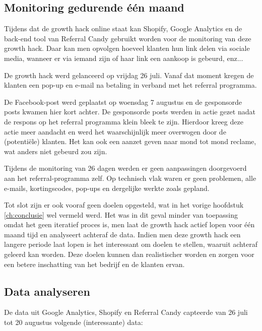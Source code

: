 \subsection{Monitoring gedurende één maand} \label{sec:monitoring-gedurende-twee-weken}
Tijdens dat de growth hack online staat kan Shopify, Google Analytics en de back-end tool van Referral Candy gebruikt worden voor de monitoring van deze growth hack. Daar kan men opvolgen hoeveel klanten hun link delen via sociale media, wanneer er via iemand zijn of haar link een aankoop is gebeurd, enz...

De growth hack werd gelanceerd op vrijdag 26 juli. Vanaf dat moment kregen de klanten een pop-up en e-mail na betaling in verband met het referral programma. 

De Facebook-post werd geplaatst op woensdag 7 augustus en de gesponsorde posts kwamen hier kort achter. De gesponsorde posts werden in actie gezet nadat de respons op het referral programma klein bleek te zijn. Hierdoor kreeg deze actie meer aandacht en werd het waarschijnlijk meer overwogen door de (potentiële) klanten. Het kan ook een aanzet geven naar mond tot mond reclame, wat anders niet gebeurd zou zijn.

Tijdens de monitoring van 26 dagen werden er geen aanpassingen doorgevoerd aan het referral-programma zelf. Op technisch vlak waren er geen problemen, alle e-mails, kortingscodes, pop-ups en dergelijke werkte zoals gepland.

Tot slot zijn er ook vooraf geen doelen opgesteld, wat in het vorige hoofdstuk \ref{ch:conclusie} wel vermeld werd. Het was in dit geval minder van toepassing omdat het geen iteratief proces is, men laat de growth hack actief lopen voor één maand tijd en analyseert achteraf de data. Indien men deze growth hack een langere periode laat lopen is het interessant om doelen te stellen, waaruit achteraf geleerd kan worden. Deze doelen kunnen dan realistischer worden en zorgen voor een betere inschatting van het bedrijf en de klanten ervan.

\subsection{Data analyseren} \label{sec:data-analyseren}
De data uit Google Analytics, Shopify en Referral Candy capteerde van 26 juli tot 20 augustus volgende (interessante) data:

